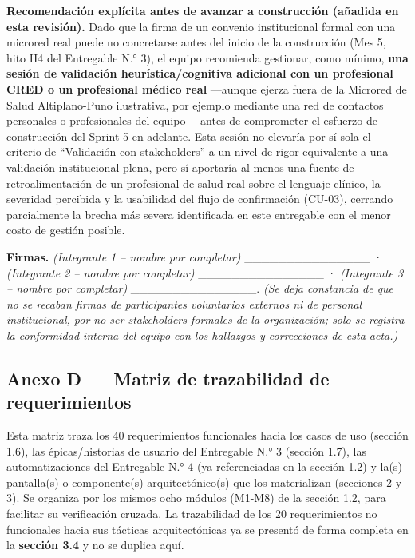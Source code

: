 \documentclass[11pt,a4paper]{article}
\begin{document}
\textbf{Recomendación explícita antes de avanzar a construcción (añadida en esta revisión).} Dado que la firma de un convenio institucional formal con una microred real puede no concretarse antes del inicio de la construcción (Mes 5, hito H4 del Entregable N.° 3), el equipo recomienda gestionar, como mínimo, \textbf{una sesión de validación heurística/cognitiva adicional con un profesional CRED o un profesional médico real} ---aunque ejerza fuera de la Microred de Salud Altiplano-Puno ilustrativa, por ejemplo mediante una red de contactos personales o profesionales del equipo--- antes de comprometer el esfuerzo de construcción del Sprint 5 en adelante. Esta sesión no elevaría por sí sola el criterio de ``Validación con stakeholders'' a un nivel de rigor equivalente a una validación institucional plena, pero sí aportaría al menos una fuente de retroalimentación de un profesional de salud real sobre el lenguaje clínico, la severidad percibida y la usabilidad del flujo de confirmación (CU-03), cerrando parcialmente la brecha más severa identificada en este entregable con el menor costo de gestión posible.

\textbf{Firmas.} \textit{(Integrante 1 -- nombre por completar)} \_\_\_\_\_\_\_\_\_\_\_\_\_\_\_ · \textit{(Integrante 2 -- nombre por completar)} \_\_\_\_\_\_\_\_\_\_\_\_\_\_\_ · \textit{(Integrante 3 -- nombre por completar)} \_\_\_\_\_\_\_\_\_\_\_\_\_\_\_. \emph{(Se deja constancia de que no se recaban firmas de participantes voluntarios externos ni de personal institucional, por no ser stakeholders formales de la organización; solo se registra la conformidad interna del equipo con los hallazgos y correcciones de esta acta.)}

\subsection{Anexo D --- Matriz de trazabilidad de requerimientos}\label{anexo-d-matriz-de-trazabilidad-de-requerimientos}

Esta matriz traza los 40 requerimientos funcionales hacia los casos de uso (sección 1.6), las épicas/historias de usuario del Entregable N.° 3 (sección 1.7), las automatizaciones del Entregable N.° 4 (ya referenciadas en la sección 1.2) y la(s) pantalla(s) o componente(s) arquitectónico(s) que los materializan (secciones 2 y 3). Se organiza por los mismos ocho módulos (M1-M8) de la sección 1.2, para facilitar su verificación cruzada. La trazabilidad de los 20 requerimientos no funcionales hacia sus tácticas arquitectónicas ya se presentó de forma completa en la \textbf{sección 3.4} y no se duplica aquí.
\end{document}
